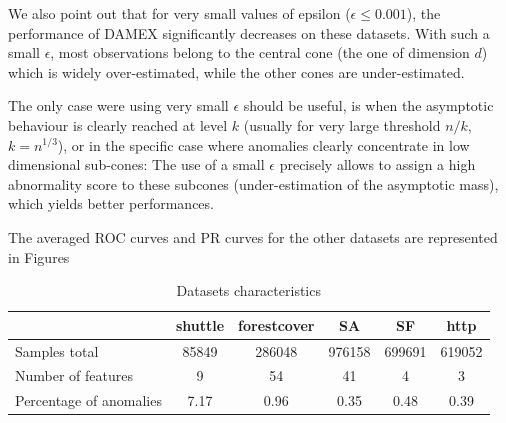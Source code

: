 We also point out that for very small values of epsilon ($\epsilon \le 0.001$),
the performance of DAMEX significantly decreases on these datasets.
With such a small $\epsilon$, most observations belong to the central cone
(the one of dimension $d$) which is widely over-estimated, while the other cones are under-estimated.%

The only case were using very small $\epsilon$ should be useful, is when the asymptotic behaviour is
clearly reached at level $k$ (usually for very large threshold $n/k$, \eg~$k=n^{1/3}$), or in the
specific case where anomalies clearly concentrate in low dimensional sub-cones: The use of a small $\epsilon$ precisely allows
to assign a high abnormality score to these subcones (under-estimation of the asymptotic mass), which yields better performances.


The averaged ROC curves and PR curves for the other datasets are represented in Figures
\begin{table}[!ht]
\centering
\footnotesize
\begin{tabular}{|l|ccccc|}
  \hline
   ~                   & shuttle & forestcover & SA     & SF     & http    \\
  \hline
  Samples total        & 85849   & 286048      & 976158 & 699691 & 619052  \\
  Number of features   & 9       & 54          & 41     & 4      & 3       \\
  Percentage of anomalies & 7.17    & 0.96        & 0.35   & 0.48   & 0.39 \\
\hline
\end{tabular}
\caption{Datasets characteristics}
\label{jmva:table:data}
\end{table}

